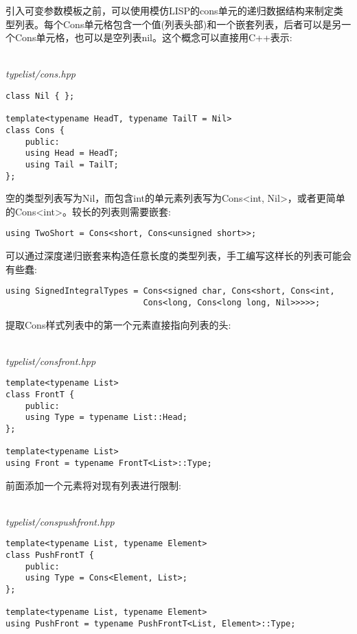 引入可变参数模板之前，可以使用模仿LISP的cons单元的递归数据结构来制定类型列表。每个Cons单元格包含一个值(列表头部)和一个嵌套列表，后者可以是另一个Cons单元格，也可以是空列表nil。这个概念可以直接用C++表示:

\hspace*{\fill} \\ %
\noindent
\textit{typelist/cons.hpp}
\begin{lstlisting}[style=styleCXX]
class Nil { };

template<typename HeadT, typename TailT = Nil>
class Cons {
	public:
	using Head = HeadT;
	using Tail = TailT;
};
\end{lstlisting}

空的类型列表写为Nil，而包含int的单元素列表写为Cons<int, Nil>，或者更简单的Cons<int>。较长的列表则需要嵌套:

\begin{lstlisting}[style=styleCXX]
using TwoShort = Cons<short, Cons<unsigned short>>;
\end{lstlisting}

可以通过深度递归嵌套来构造任意长度的类型列表，手工编写这样长的列表可能会有些蠢:

\begin{lstlisting}[style=styleCXX]
using SignedIntegralTypes = Cons<signed char, Cons<short, Cons<int,
							Cons<long, Cons<long long, Nil>>>>>;
\end{lstlisting}

提取Cons样式列表中的第一个元素直接指向列表的头:

\hspace*{\fill} \\ %
\noindent
\textit{typelist/consfront.hpp}
\begin{lstlisting}[style=styleCXX]
template<typename List>
class FrontT {
	public:
	using Type = typename List::Head;
};

template<typename List>
using Front = typename FrontT<List>::Type;
\end{lstlisting}

前面添加一个元素将对现有列表进行限制:

\hspace*{\fill} \\ %
\noindent
\textit{typelist/conspushfront.hpp}
\begin{lstlisting}[style=styleCXX]
template<typename List, typename Element>
class PushFrontT {
	public:
	using Type = Cons<Element, List>;
};

template<typename List, typename Element>
using PushFront = typename PushFrontT<List, Element>::Type;
\end{lstlisting}

